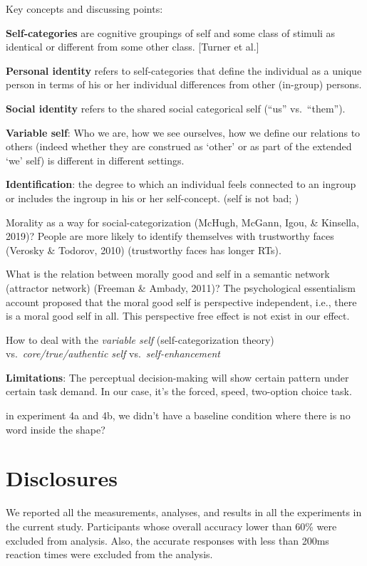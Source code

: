 \documentclass[
  english,
  man]{apa6}
\begin{document}
Key concepts and discussing points:

\textbf{Self-categories} are cognitive groupings of self and some class of stimuli as identical or different from some other class. {[}Turner et al.{]}

\textbf{Personal identity} refers to self-categories that define the individual as a unique person in terms of his or her individual differences from other (in-group) persons.

\textbf{Social identity} refers to the shared social categorical self (``us'' vs.~``them'').

\textbf{Variable self}: Who we are, how we see ourselves, how we define our relations to others (indeed whether they are construed as `other' or as part of the extended `we' self) is different in different settings.

\textbf{Identification}: the degree to which an individual feels connected to an ingroup or includes the ingroup in his or her self-concept. (self is not bad; )

Morality as a way for social-categorization (McHugh, McGann, Igou, \& Kinsella, 2019)? People are more likely to identify themselves with trustworthy faces (Verosky \& Todorov, 2010) (trustworthy faces has longer RTs).

What is the relation between morally good and self in a semantic network (attractor network) (Freeman \& Ambady, 2011)? The psychological essentialism account proposed that the moral good self is perspective independent, i.e., there is a moral good self in all. This perspective free effect is not exist in our effect.

How to deal with the \emph{variable self} (self-categorization theory) vs.~\emph{core/true/authentic self} vs.~\emph{self-enhancement}

\textbf{Limitations}:
The perceptual decision-making will show certain pattern under certain task demand. In our case, it's the forced, speed, two-option choice task.

in experiment 4a and 4b, we didn't have a baseline condition where there is no word inside the shape?

\hypertarget{disclosures}{%
\section{Disclosures}\label{disclosures}}

We reported all the measurements, analyses, and results in all the experiments in the current study. Participants whose overall accuracy lower than 60\% were excluded from analysis. Also, the accurate responses with less than 200ms reaction times were excluded from the analysis.
\end{document}
